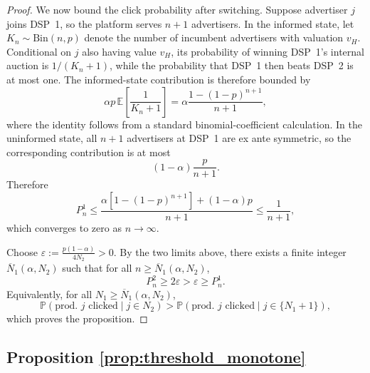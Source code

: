\documentclass[11pt]{article}
\theoremstyle{plain}
\theoremstyle{definition}
\theoremstyle{plain}
\theoremstyle{plain}
\theoremstyle{plain}
\theoremstyle{plain}
\numberwithin{equation}{section}
\begin{document}
\begin{proof}
\vspace{2mm}

\noindent We now bound the click probability after switching. Suppose advertiser $j$ joins DSP~1, so the platform serves $n+1$ advertisers. In the informed state, let $K_n \sim \mathrm{Bin}(n,p)$ denote the number of incumbent advertisers with valuation $v_H$. Conditional on $j$ also having value $v_H$, its probability of winning DSP~1's internal auction is $1/(K_n+1)$, while the probability that DSP~1 then beats DSP~2 is at most one. The informed-state contribution is therefore bounded by
\begin{equation*}
    \alpha p \, \mathbb{E}\!\left[\frac{1}{K_n+1}\right] = \alpha \frac{1-(1-p)^{n+1}}{n+1},
\end{equation*}
where the identity follows from a standard binomial-coefficient calculation. In the uninformed state, all $n+1$ advertisers at DSP~1 are ex ante symmetric, so the corresponding contribution is at most
\begin{equation*}
    (1-\alpha)\frac{p}{n+1}.
\end{equation*}
Therefore
\begin{equation*}
    P_n^{1} \leq \frac{\alpha[1-(1-p)^{n+1}] + (1-\alpha)p}{n+1} \leq \frac{1}{n+1},
\end{equation*}
which converges to zero as $n\to\infty$.

\vspace{2mm}

\noindent Choose $\varepsilon := \frac{p(1-\alpha)}{4N_2} > 0$. By the two limits above, there exists a finite integer $\overline{N}_1(\alpha,N_2)$ such that for all $n \geq \overline{N}_1(\alpha,N_2)$,
\begin{equation*}
    P_n^{2} \geq 2\varepsilon > \varepsilon \geq P_n^{1}.
\end{equation*}
Equivalently, for all $N_1 \geq \overline{N}_1(\alpha,N_2)$,
\begin{equation*}
    \mathbb{P}(\text{prod.\ } j \text{ clicked} \mid j \in N_2) > \mathbb{P}(\text{prod.\ } j \text{ clicked} \mid j \in \{N_1+1\}),
\end{equation*}
which proves the proposition.
\end{proof}

\vspace{3mm}

\subsection*{Proposition \ref{prop:threshold_monotone}}
\end{document}
